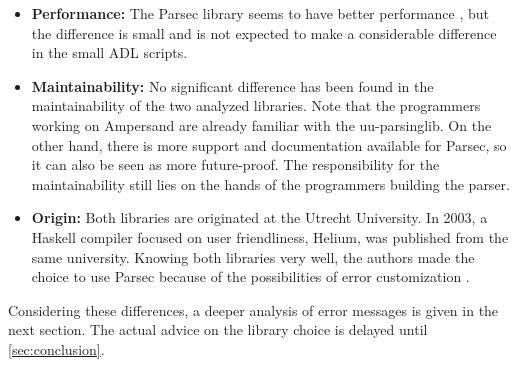 \begin{itemize}
	\item \textbf{Performance:} The Parsec library seems to have better performance , but the difference is small and is not expected to make a considerable difference in the small ADL scripts.
	\item \textbf{Maintainability:} No significant difference has been found in the maintainability of the two analyzed libraries.
		Note that the programmers working on Ampersand are already familiar with the uu-parsinglib.
		On the other hand, there is more support and documentation available for Parsec, so it can also be seen as more future-proof.
		The responsibility for the maintainability still lies on the hands of the programmers building the parser.
	\item \textbf{Origin:} Both libraries are originated at the Utrecht University.
		In 2003, a Haskell compiler focused on user friendliness, Helium, was published from the same university.
		Knowing both libraries very well, the authors made the choice to use Parsec because of the possibilities of error customization .
\end{itemize}
%
Considering these differences, a deeper analysis of error messages is given in the next section.
The actual advice on the library choice is delayed until \autoref{sec:conclusion}.
